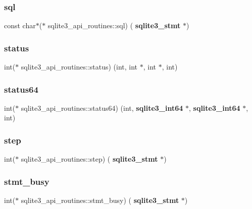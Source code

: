 \mbox{\label{structsqlite3__api__routines_a0d4c8662baae0bd626f0ee334183e69e}} 
\subsubsection{sql}
{\footnotesize\ttfamily const char$\ast$($\ast$ sqlite3\+\_\+api\+\_\+routines\+::sql) (\textbf{ sqlite3\+\_\+stmt} $\ast$)}

\mbox{\label{structsqlite3__api__routines_a8fe0dcf3d691ef190272907e6fc9a8ae}} 
\subsubsection{status}
{\footnotesize\ttfamily int($\ast$ sqlite3\+\_\+api\+\_\+routines\+::status) (int, int $\ast$, int $\ast$, int)}

\mbox{\label{structsqlite3__api__routines_a9c7fc0670fc12345b03148a9b7cd22e0}} 
\subsubsection{status64}
{\footnotesize\ttfamily int($\ast$ sqlite3\+\_\+api\+\_\+routines\+::status64) (int, \textbf{ sqlite3\+\_\+int64} $\ast$, \textbf{ sqlite3\+\_\+int64} $\ast$, int)}

\mbox{\label{structsqlite3__api__routines_ad83c0c75185e68a850ec912cb886af0d}} 
\subsubsection{step}
{\footnotesize\ttfamily int($\ast$ sqlite3\+\_\+api\+\_\+routines\+::step) (\textbf{ sqlite3\+\_\+stmt} $\ast$)}

\mbox{\label{structsqlite3__api__routines_a046c107f8b417c85acc32a4d964aa913}} 
\subsubsection{stmt\_busy}
{\footnotesize\ttfamily int($\ast$ sqlite3\+\_\+api\+\_\+routines\+::stmt\+\_\+busy) (\textbf{ sqlite3\+\_\+stmt} $\ast$)}


